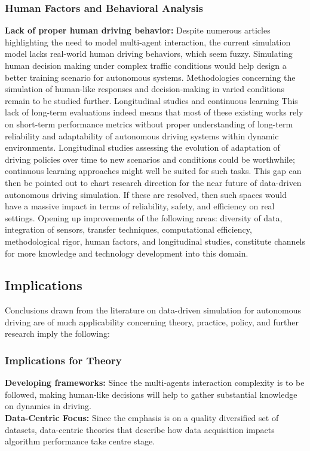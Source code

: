 \documentclass[lettersize,journal]{IEEEtran}
\begin{document}
\subsubsection{Human Factors and Behavioral Analysis}
\textbf{Lack of proper human driving behavior:} Despite numerous articles highlighting the need to model multi-agent interaction, the current simulation model lacks real-world human driving behaviors, which seem fuzzy. Simulating human decision making under complex traffic conditions would help design a better training scenario for autonomous systems. Methodologies concerning the simulation of human-like responses and decision-making in varied conditions remain to be studied further. Longitudinal studies and continuous learning This lack of long-term evaluations indeed means that most of these existing works rely on short-term performance metrics without proper understanding of long-term reliability and adaptability of autonomous driving systems within dynamic environments. Longitudinal studies assessing the evolution of adaptation of driving policies over time to new scenarios and conditions could be worthwhile; continuous learning approaches might well be suited for such tasks. This gap can then be pointed out to chart research direction for the near future of data-driven autonomous driving simulation. If these are resolved, then such spaces would have a massive impact in terms of reliability, safety, and efficiency on real settings. Opening up improvements of the following areas: diversity of data, integration of sensors, transfer techniques, computational efficiency, methodological rigor, human factors, and longitudinal studies, constitute channels for more knowledge and technology development into this domain.
\\
\subsection{Implications}
Conclusions drawn from the literature on data-driven simulation for autonomous driving are of much applicability concerning theory, practice, policy, and further research imply the following:

\subsubsection{Implications for Theory}
\textbf{Developing frameworks:} Since the multi-agents interaction complexity is to be followed, making human-like decisions will help to gather substantial knowledge on dynamics in driving.\\
\textbf{Data-Centric Focus:} Since the emphasis is on a quality diversified set of datasets, data-centric theories that describe how data acquisition impacts algorithm performance take centre stage.
\end{document}
